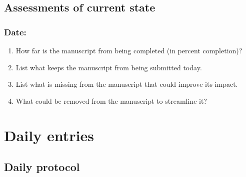 \documentclass[11pt,letterpaper]{article}
\begin{document}
\subsection{Assessments of current state}
\label{sec:org3dce00b}



\subsubsection{Date:}
\label{sec:org9dd784b}



\begin{enumerate}
\item How far is the manuscript from being completed (in percent completion)?
\label{sec:orga37cbe2}





\item List what keeps the manuscript from being submitted today.
\label{sec:org2619a5b}





\item List what is missing from the manuscript that could improve its impact.
\label{sec:org0ba5cb0}






\item What could be removed from the manuscript to streamline it?
\label{sec:org24a5c40}
\end{enumerate}








\section{Daily entries}
\label{sec:org523211b}


\subsection{Daily protocol}
\label{sec:org7813ec5}
\end{document}
